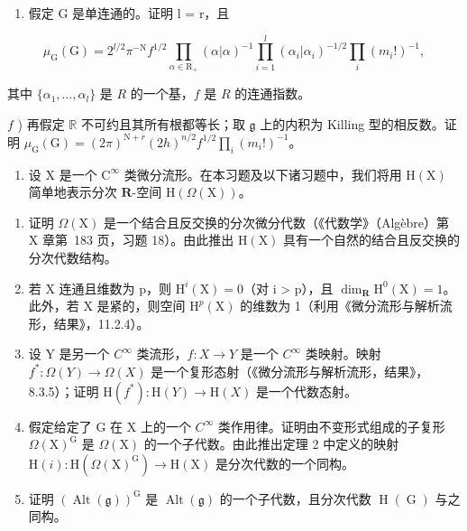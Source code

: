 \begin{enumerate}
\begin{enumerate}
\def\labelenumi{\alph{enumi})}
\setcounter{enumi}{4}
\tightlist
\item
  假定 G 是单连通的。证明 l = r，且
\end{enumerate}

\[
\mu_ {\mathrm{G}} (\mathrm{G}) = 2 ^ {l / 2} \pi^ {- \mathrm{N}} f ^ {1 / 2} \prod_ {\alpha \in \mathrm{R} _ {+}} (\alpha | \alpha) ^ {- 1} \prod_ {i = 1} ^ {l} (\alpha_ {i} | \alpha_ {i}) ^ {- 1 / 2} \prod_ {i} (m _ {i}!) ^ {- 1},
\]

其中 \(\{\alpha_1, \ldots, \alpha_l\}\) 是 \(R\) 的一个基，\(f\) 是 \(R\) 的连通指数。

\(f\) ) 再假定 \(\mathbb{R}\) 不可约且其所有根都等长；取 \(\mathfrak{g}\) 上的内积为 Killing 型的相反数。证明 \(\mu_{\mathrm{G}}(\mathrm{G}) = (2\pi)^{\mathrm{N} + r}(2h)^{n / 2}f^{1 / 2}\prod_{i}(m_i!)^{-1}\)。

\begin{enumerate}
\def\labelenumi{\arabic{enumi})}
\setcounter{enumi}{3}
\tightlist
\item
  设 \(\mathrm{X}\) 是一个 \(\mathrm{C}^{\infty}\) 类微分流形。在本习题及以下诸习题中，我们将用 \(\mathrm{H}(\mathrm{X})\) 简单地表示分次 \(\mathbf{R}\)-空间 \(\mathrm{H}(\Omega (\mathrm{X}))\)。
\end{enumerate}

\begin{enumerate}
\def\labelenumi{\alph{enumi})}
\item
  证明 \(\Omega(\mathrm{X})\) 是一个结合且反交换的分次微分代数（《代数学》（Algèbre）第 X 章第~183 页，习题 18）。由此推出 \(\mathrm{H}(\mathrm{X})\) 具有一个自然的结合且反交换的分次代数结构。
\item
  若 X 连通且维数为 p，则 \(\mathrm{H}^{i}(\mathrm{X}) = 0\)（对 i \textgreater{} p），且 \(\dim_{\mathbf{R}} \mathrm{H}^{0}(\mathrm{X}) = 1\)。此外，若 X 是紧的，则空间 \(\mathrm{H}^{p}(\mathrm{X})\) 的维数为 1（利用《微分流形与解析流形，结果》，11.2.4）。
\item
  设 Y 是另一个 \(C^{\infty}\) 类流形，\(f: X \to Y\) 是一个 \(C^{\infty}\) 类映射。映射 \(f^{*}: \Omega(Y) \to \Omega(X)\) 是一个复形态射（《微分流形与解析流形，结果》，8.3.5）；证明 \(\mathrm{H}(f^{*}) : \mathrm{H}(Y) \to \mathrm{H}(X)\) 是一个代数态射。
\item
  假定给定了 G 在 X 上的一个 \(C^{\infty}\) 类作用律。证明由不变形式组成的子复形 \(\Omega(\mathrm{X})^{\mathrm{G}}\) 是 \(\Omega(\mathrm{X})\) 的一个子代数。由此推出定理 2 中定义的映射 \(\mathrm{H}(i):\mathrm{H}(\Omega(\mathrm{X})^{\mathrm{G}})\to\mathrm{H}(\mathrm{X})\) 是分次代数的一个同构。
\item
  证明 \((\operatorname{Alt}(\mathfrak{g}))^{\mathrm{G}}\) 是 \(\operatorname{Alt}(\mathfrak{g})\) 的一个子代数，且分次代数 \(\operatorname{H}(\operatorname{G})\) 与之同构。
\end{enumerate}


\end{enumerate}

